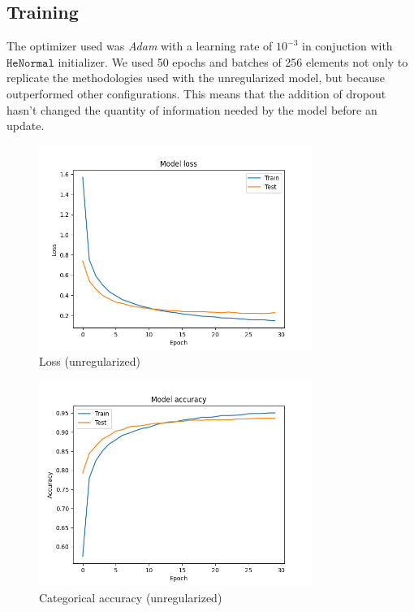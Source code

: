 \documentclass[compsoc]{IEEEtran}
\begin{document}
\subsection{Training}
The optimizer used was \emph{Adam} with a learning rate of $10^{-3}$ in conjuction with $\texttt{HeNormal}$ initializer. We used 50 epochs and batches of 256 elements 
not only to replicate the methodologies used with the unregularized model, but because outperformed other configurations. This means that the addition of dropout hasn't changed the quantity of information needed by the model before an update.



\begin{figure}[ht!]
\centering                                                                        
\includegraphics[width=3.5in]{../images/reg/loss-LeakyReLU-NoneType-categorical_crossentropy-Adam-50-256-0.1.png}
\captionsetup{justification=centering}                                                                                                                              
\caption{Loss (unregularized)}
\label{fig:loss2}                                                                                                                                         
\end{figure}


\begin{figure}[ht!]
\centering                                                                        
\includegraphics[width=3.5in]{../images/reg/accuracy-LeakyReLU-NoneType-categorical_crossentropy-Adam-50-256-0.1.png}
\captionsetup{justification=centering}                                                                                                                            
\caption{Categorical accuracy (unregularized)}
\label{fig:acc2}                                                                                                                                          
\end{figure} 
\end{document}
